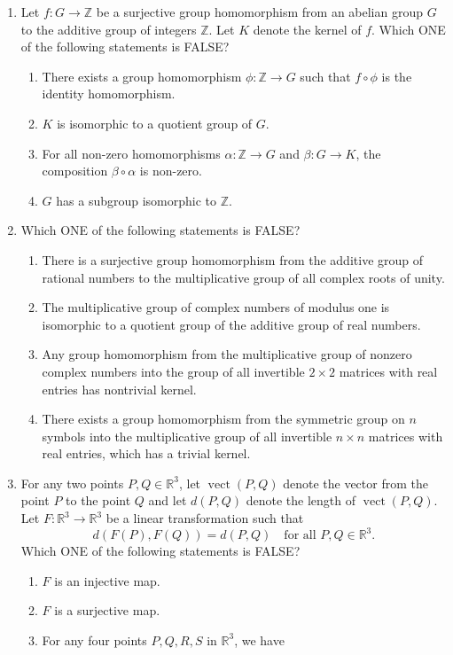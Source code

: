 \begin{enumerate}
\item Let $f:G\to\mathbb Z$ be a surjective group homomorphism from an abelian group $G$ to the additive group of integers $\mathbb Z$. Let $K$ denote the kernel of $f$. Which ONE of the following statements is FALSE?
\begin{enumerate}[label=(\Alph*)]
\item There exists a group homomorphism $\phi:\mathbb Z\to G$ such that $f\circ\phi$ is the identity homomorphism.
\item $K$ is isomorphic to a quotient group of $G$.
\item For all non-zero homomorphisms $\alpha:\mathbb Z\to G$ and $\beta:G\to K$, the composition $\beta\circ\alpha$ is non-zero.
\item $G$ has a subgroup isomorphic to $\mathbb Z$.
\end{enumerate}
\item Which ONE of the following statements is FALSE?
\begin{enumerate}[label=(\Alph*)]
\item There is a surjective group homomorphism from the additive group of rational numbers to the multiplicative group of all complex roots of unity.
\item The multiplicative group of complex numbers of modulus one is isomorphic to a quotient group of the additive group of real numbers.
\item Any group homomorphism from the multiplicative group of nonzero complex numbers into the group of all invertible $2\times2$ matrices with real entries has nontrivial kernel.
\item There exists a group homomorphism from the symmetric group on $n$ symbols into the multiplicative group of all invertible $n\times n$ matrices with real entries, which has a trivial kernel.
\end{enumerate}
\item For any two points $P,Q\in\mathbb R^3$, let $\operatorname{vect}(P,Q)$ denote the vector from the point $P$ to the point $Q$ and let $d(P,Q)$ denote the length of $\operatorname{vect}(P,Q)$. Let $F:\mathbb R^3\to\mathbb R^3$ be a linear transformation such that
\[d(F(P),F(Q))=d(P,Q)\quad\text{for all }P,Q\in\mathbb R^3.\]
Which ONE of the following statements is FALSE?
\begin{enumerate}[label=(\Alph*)]
\item $F$ is an injective map.
\item $F$ is a surjective map.
\item For any four points $P,Q,R,S$ in $\mathbb R^3$, we have

\end{enumerate}
\end{enumerate}
